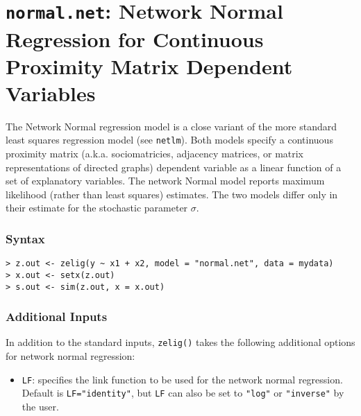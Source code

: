 \section{{\tt normal.net}: Network Normal Regression for Continuous Proximity Matrix Dependent Variables}

The Network Normal regression model is a close variant of the more standard least squares regression model (see {\tt netlm}). Both models specify a continuous proximity matrix (a.k.a. sociomatricies, adjacency matrices, or matrix representations of directed graphs) dependent variable as a linear function of a set of explanatory variables. The network Normal model reports maximum likelihood (rather than least squares) estimates. The two models differ only in their estimate for the stochastic parameter $\sigma$.

\subsubsection{Syntax}
\begin{verbatim}
> z.out <- zelig(y ~ x1 + x2, model = "normal.net", data = mydata) 
> x.out <- setx(z.out)
> s.out <- sim(z.out, x = x.out)
\end{verbatim}

\subsubsection{Additional Inputs}

In addition to the standard inputs, {\tt zelig()} takes the following additional options for network normal regression:

\begin{itemize}
\item {\tt LF}: specifies the link function to be used for the network normal regression. Default is {\tt LF="identity"}, but {\tt LF} can also be set to {\tt "log"} or {\tt "inverse"} by the user.
\end{itemize}

